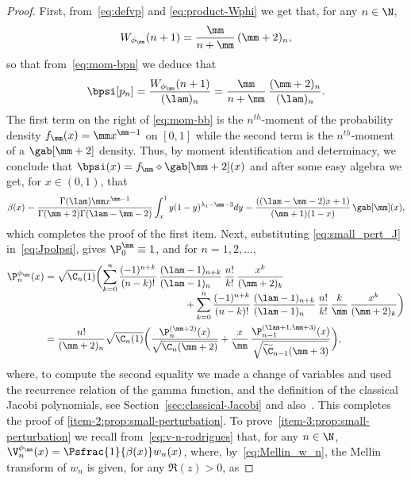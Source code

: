 \begin{proof}
First, from~\eqref{eq:defvp} and \eqref{eq:product-Wphi} we get that, for any $n \in \N$,
\begin{equation}
\label{eq:small_pert_J}
W_{\phi_{\mm}}(n+1) = \frac{\mm}{n+\mm}\, (\mm+2)_n,\end{equation}
so that from~\eqref{eq:mom-bpn} we deduce that
\begin{equation}
\label{eq:mom-bb}
\bpsi [p_n] = \frac{W_{\phi_{\mm}}(n+1)}{(\lam)_n} = \frac{\mm}{n+\mm}\, \frac{(\mm+2)_n}{(\lam)_n}.
\end{equation}
The first term on the right of \eqref{eq:mom-bb} is the $n^{th}$-moment of the probability density $f_\mm(x) = \mm x^{\mm-1}$ on $[0,1]$ while the second term is the $n^{th}$-moment of a $\gab[\mm+2]$ density. Thus, by moment identification and determinacy, we conclude that $\bpsi(x) = f_\mm \diamond \gab[\mm+2](x)$ and after some easy algebra we get, for $x \in (0,1)$, that
\begin{equation*}
\beta(x) = \frac{\Gamma(\lam)\mm x^{\mm-1}}{\Gamma(\mm+2)\Gamma(\lam-\mm-2)} \int_x^1 y (1-y)^{\lambda_1 - \mm - 3} dy
= \frac{((\lam - \mm - 2)x+1)}{(\mm+1)(1-x)}\, \gab[\mm](x),
\end{equation*}
which completes the proof of the first item. Next, substituting \eqref{eq:small_pert_J} in~\eqref{eq:Jpolpsi}, gives $\P_0^{\mm} \equiv 1$, and for $n = 1,2,\ldots$,
\begin{align*}
\P_n^{\phi_\mm}(x) &= \sqrt{\C_n(1)}\biggl( \sum_{k=0}^n \frac{(-1)^{n+k}}{(n-k)!}\, \frac{(\lam-1)_{n+k}}{(\lam-1)_{n\phantom{+k}}}\, \frac{n!}{k!}\, \frac{x^k}{(\mm+2)_k}\\[-5pt]
&\hspace*{5cm}+ \sum_{k=0}^n \frac{(-1)^{n+k}}{(n-k)!}\, \frac{(\lam-1)_{n+k}}{(\lam-1)_{n\phantom{+k}}}\, \frac{n!}{k!}\,\frac{k}{\mm}\, \frac{x^k}{(\mm+2)_k} \biggr) \\
&= \frac{n!}{(\mm+2)_n} \sqrt{\C_n(1)} \biggl( \frac{\P_n^{(\mm+2 )} (x)}{\sqrt{\C_n(\mm+2)}} + \frac{x}{\mm}\, \frac{\P_{n-1}^{(\lam+1,\mm+3)}(x)}{\sqrt{\widetilde{\C}_{n-1}(\mm+3)}} \biggr),
\end{align*}
where, to compute the second equality we made a change of variables and used the recurrence relation of the gamma function, and the definition of the classical Jacobi polynomials, see Section~\ref{sec:classical-Jacobi} and also~\cite{orthogonal_pols}. This completes the proof of \eqref{item-2:prop:small-perturbation}. To prove~\eqref{item-3:prop:small-perturbation} we recall from~\eqref{eq:v-n-rodrigues} that, for any $n \in \N$, $\V_n^{\phi_\mm}(x)= \Psfrac{1}{\beta(x)}w_n(x)$, where, by~\eqref{eq:Mellin_w_n}, the Mellin transform of $w_n$ is given, for any $\Re(z)>0$, as

\end{proof}
